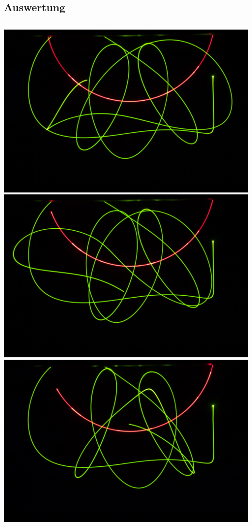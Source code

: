 \subsection{Auswertung}
\begin{frame}
	\begin{columns}
	\includegraphics[width=\textwidth]{images/4/pendel-6}\\
	\includegraphics[width=\textwidth]{images/4/pendel-7}
	\includegraphics[width=\textwidth]{images/4/pendel-8}\\

\end{columns}
\end{frame}
